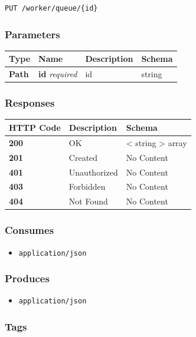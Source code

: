 \begin{verbatim}
PUT /worker/queue/{id}
\end{verbatim}

\subsubsection{Parameters}\label{parameters-20}

\begin{longtable}[]{@{}llll@{}}
\toprule
Type & Name & Description & Schema\tabularnewline
\midrule
\endhead
\textbf{Path} & \textbf{id} \emph{required} & id & string\tabularnewline
\bottomrule
\end{longtable}

\subsubsection{Responses}\label{responses-24}

\begin{longtable}[]{@{}lll@{}}
\toprule
HTTP Code & Description & Schema\tabularnewline
\midrule
\endhead
\textbf{200} & OK & \textless{} string \textgreater{}
array\tabularnewline
\textbf{201} & Created & No Content\tabularnewline
\textbf{401} & Unauthorized & No Content\tabularnewline
\textbf{403} & Forbidden & No Content\tabularnewline
\textbf{404} & Not Found & No Content\tabularnewline
\bottomrule
\end{longtable}

\subsubsection{Consumes}\label{consumes-10}

\begin{itemize}
\tightlist
\item
  \texttt{application/json}
\end{itemize}

\subsubsection{Produces}\label{produces-24}

\begin{itemize}
\tightlist
\item
  \texttt{application/json}
\end{itemize}

\subsubsection{Tags}\label{tags-24}

